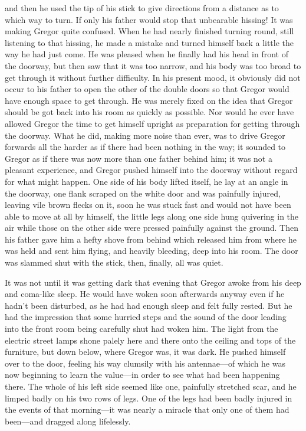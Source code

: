and then he used the tip of his stick to give directions from a
distance as to which way to turn. If only his father would stop that
unbearable hissing! It was making Gregor quite confused. When he had
nearly finished turning round, still listening to that hissing, he made
a mistake and turned himself back a little the way he had just come. He
was pleased when he finally had his head in front of the doorway, but
then saw that it was too narrow, and his body was too broad to get
through it without further difficulty. In his present mood, it
obviously did not occur to his father to open the other of the double
doors so that Gregor would have enough space to get through. He was
merely fixed on the idea that Gregor should be got back into his room
as quickly as possible. Nor would he ever have allowed Gregor the time
to get himself upright as preparation for getting through the doorway.
What he did, making more noise than ever, was to drive Gregor forwards
all the harder as if there had been nothing in the way; it sounded to
Gregor as if there was now more than one father behind him; it was not
a pleasant experience, and Gregor pushed himself into the doorway
without regard for what might happen. One side of his body lifted
itself, he lay at an angle in the doorway, one flank scraped on the
white door and was painfully injured, leaving vile brown flecks on it,
soon he was stuck fast and would not have been able to move at all by
himself, the little legs along one side hung quivering in the air while
those on the other side were pressed painfully against the ground. Then
his father gave him a hefty shove from behind which released him from
where he was held and sent him flying, and heavily bleeding, deep into
his room. The door was slammed shut with the stick, then, finally, all
was quiet.

\endchapter


It was not until it was getting dark that evening that Gregor awoke
from his deep and coma-like sleep. He would have woken soon afterwards
anyway even if he hadn’t been disturbed, as he had had enough sleep and
felt fully rested. But he had the impression that some hurried steps
and the sound of the door leading into the front room being carefully
shut had woken him. The light from the electric street lamps shone
palely here and there onto the ceiling and tops of the furniture, but
down below, where Gregor was, it was dark. He pushed himself over to
the door, feeling his way clumsily with his antennae—of which he was
now beginning to learn the value—in order to see what had been
happening there. The whole of his left side seemed like one, painfully
stretched scar, and he limped badly on his two rows of legs. One of the
legs had been badly injured in the events of that morning—it was nearly
a miracle that only one of them had been—and dragged along lifelessly.


